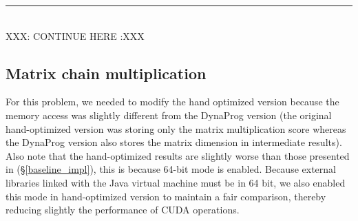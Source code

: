 \newpage
{\center\color{red} \noindent\rule{16cm}{0.4pt} \\ XXX: CONTINUE HERE :XXX \\}
\subsection{Matrix chain multiplication}

For this problem, we needed to modify the hand optimized version because the memory access was slightly different from the DynaProg version (the original hand-optimized version was storing only the matrix multiplication score whereas the DynaProg version also stores the matrix dimension in intermediate results). Also note that the hand-optimized results are slightly worse than those presented in (\S\ref{baseline_impl}), this is because 64-bit mode is enabled. Because external libraries linked with the Java virtual machine must be in 64 bit, we also enabled this mode in hand-optimized version to maintain a fair comparison, thereby reducing slightly the performance of CUDA operations.

